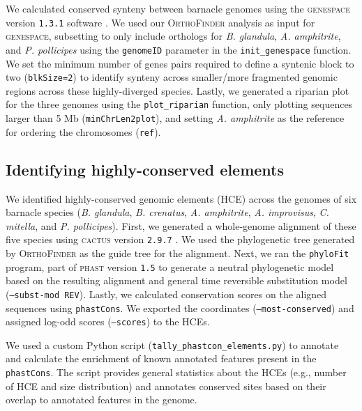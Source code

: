 \documentclass[11pt]{article}
\newcommand{\bgla}{\textit{B. glandula}\xspace}
\begin{document}
We calculated conserved synteny between barnacle genomes using the
\textsc{genespace} version \texttt{1.3.1} software \citep{lovell_genespace_2022}.
We used our \textsc{OrthoFinder} analysis as input for \textsc{genespace}, subsetting
to only include orthologs for \bgla, \textit{A. amphitrite}, and \textit{P.
pollicipes} using the \texttt{genomeID} parameter in the \texttt{init\_genespace}
function. We set the minimum number of genes pairs required to define a syntenic
block to two (\texttt{blkSize=2}) to identify synteny across smaller/more
fragmented genomic regions across these highly-diverged species. Lastly, we
generated a riparian plot for the three genomes using the \texttt{plot\_riparian}
function, only plotting sequences larger than 5 Mb (\texttt{minChrLen2plot}),
and setting \textit{A. amphitrite} as the reference for ordering the chromosomes
(\texttt{ref}).

\subsection*{Identifying highly-conserved elements}

We identified highly-conserved genomic elements (HCE) across the genomes of six
barnacle species (\bgla, \textit{B. crenatus}, \textit{A. amphitrite},
\textit{A. improvisus}, \textit{C. mitella}, and \textit{P. pollicipes}).
First, we generated a whole-genome alignment of these five species using
\textsc{cactus} version \texttt{2.9.7} \citep{armstrong_progressive_2020}.
We used the phylogenetic tree generated by \textsc{OrthoFinder} as the guide tree
for the alignment.
Next, we ran the \texttt{phyloFit} program, part of \textsc{phast} version
\texttt{1.5} \citep{siepel_evolutionarily_2005} to generate a neutral
phylogenetic model based on the resulting alignment and general time reversible
substitution model (\texttt{--subst-mod REV}).
Lastly, we calculated conservation scores on the aligned sequences using 
\texttt{phastCons}.
We exported the coordinates (\texttt{--most-conserved}) and assigned
log-odd scores (\texttt{--scores}) to the HCEs.
\vspace{0.2cm}

We used a custom Python script (\texttt{tally\_phastcon\_elements.py}) to
annotate and calculate the enrichment of known annotated features present in
the \texttt{phastCons}. The script provides general statistics about the HCEs
(e.g., number of HCE and size distribution) and annotates conserved sites
based on their overlap to annotated features in the genome.
\end{document}
